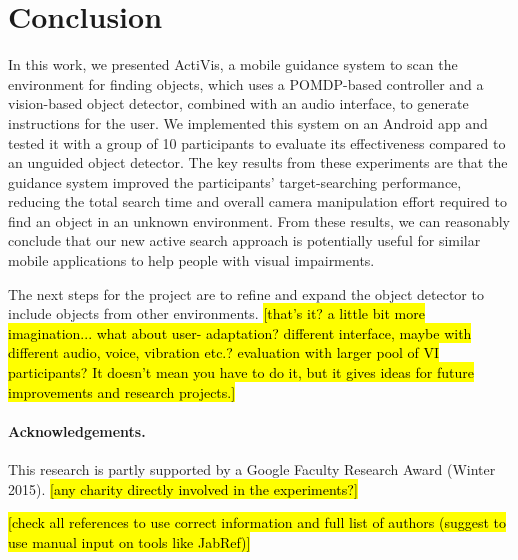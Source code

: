 \documentclass[runningheads]{llncs}
\DeclareRobustCommand{\tofix}[1]{{\sethlcolor{yellow}\hl{[#1]}}}
\begin{document}

\section{Conclusion}\label{sec:conclusion}

In this work, we presented ActiVis, a mobile guidance system to scan the environment for finding objects, which uses a POMDP-based controller and a vision-based object detector, combined with an audio interface, to generate instructions for the user. 
We implemented this system on an Android app and tested it with a group of 10 participants to evaluate its effectiveness compared to an unguided object detector. 
The key results from these experiments are that the guidance system improved the participants' target-searching performance, reducing the total search time and overall camera manipulation effort required to find an object in an unknown environment.
From these results, we can reasonably conclude that our new active search approach is potentially useful for similar mobile applications to help people with visual impairments.

The next steps for the project are to refine and expand the object detector to include objects from other environments. \tofix{that's it? a little bit more imagination... what about user- adaptation? different interface, maybe with different audio, voice, vibration etc.? evaluation with larger pool of VI participants? It doesn't mean you have to do it, but it gives ideas for future improvements and research projects.}

\paragraph{{\bf Acknowledgements.}}\label{sec:acknowledge}
This research is partly supported by a Google Faculty Research Award (Winter 2015).
\tofix{any charity directly involved in the experiments?}

\tofix{check all references to use correct information and full list of authors (suggest to use manual input on tools like JabRef)}


\end{document}
